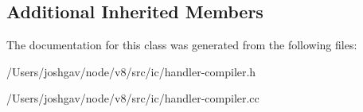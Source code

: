 \subsection*{Additional Inherited Members}


The documentation for this class was generated from the following files\+:\begin{DoxyCompactItemize}
\item 
/\+Users/joshgav/node/v8/src/ic/handler-\/compiler.\+h\item 
/\+Users/joshgav/node/v8/src/ic/handler-\/compiler.\+cc\end{DoxyCompactItemize}
